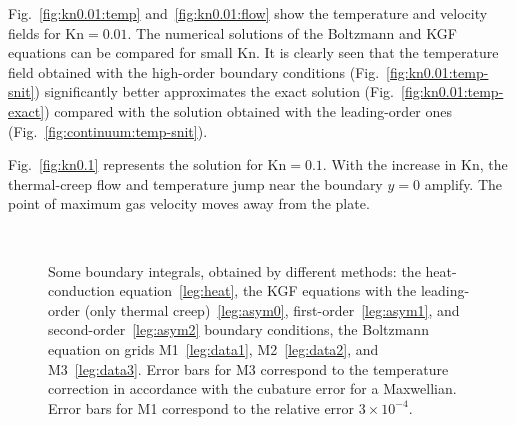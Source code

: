\documentclass[10pt]{article}
\newcommand{\Kn}{\mathrm{Kn}}
\begin{document}
Fig.~\ref{fig:kn0.01:temp} and~\ref{fig:kn0.01:flow} show the temperature and velocity fields for \(\Kn=0.01\).
The numerical solutions of the Boltzmann and KGF equations can be compared for small \(\Kn\).
It is clearly seen that the temperature field obtained with the high-order boundary conditions (Fig.~\ref{fig:kn0.01:temp-snit})
significantly better approximates the exact solution (Fig.~\ref{fig:kn0.01:temp-exact})
compared with the solution obtained with the leading-order ones (Fig.~\ref{fig:continuum:temp-snit}).

Fig.~\ref{fig:kn0.1} represents the solution for \(\Kn=0.1\).
With the increase in \(\Kn\), the thermal-creep flow and temperature jump near the boundary \(y=0\) amplify.
The point of maximum gas velocity moves away from the plate.

\begin{figure}
    \centering
    \\
    \caption{
        Some boundary integrals, obtained by different methods:
        the heat-conduction equation~\ref{leg:heat},
        the KGF equations with the leading-order (only thermal creep)~\ref{leg:asym0},
        first-order~\ref{leg:asym1}, and second-order~\ref{leg:asym2} boundary conditions,
        the Boltzmann equation on grids M1~\ref{leg:data1}, M2~\ref{leg:data2}, and M3~\ref{leg:data3}.
        Error bars for M3 correspond to the temperature correction in accordance with
        the cubature error for a Maxwellian.
        Error bars for M1 correspond to the relative error \(3\times 10^{-4}\).
    }
    \label{fig:comparison}
\end{figure}
\end{document}
